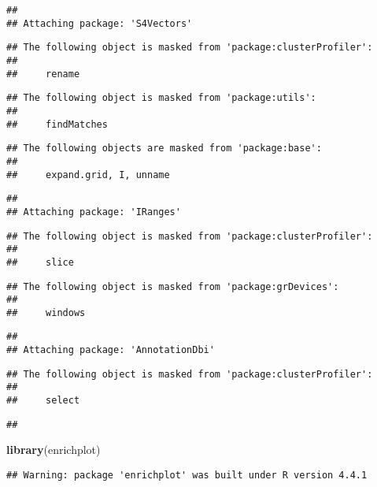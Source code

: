 \documentclass[
]{article}
\newenvironment{Shaded}{\begin{snugshade}}{\end{snugshade}}
\newcommand{\FunctionTok}[1]{\textcolor[rgb]{0.13,0.29,0.53}{\textbf{#1}}}
\newcommand{\NormalTok}[1]{#1}
\begin{document}
\begin{verbatim}
## 
## Attaching package: 'S4Vectors'
\end{verbatim}

\begin{verbatim}
## The following object is masked from 'package:clusterProfiler':
## 
##     rename
\end{verbatim}

\begin{verbatim}
## The following object is masked from 'package:utils':
## 
##     findMatches
\end{verbatim}

\begin{verbatim}
## The following objects are masked from 'package:base':
## 
##     expand.grid, I, unname
\end{verbatim}

\begin{verbatim}
## 
## Attaching package: 'IRanges'
\end{verbatim}

\begin{verbatim}
## The following object is masked from 'package:clusterProfiler':
## 
##     slice
\end{verbatim}

\begin{verbatim}
## The following object is masked from 'package:grDevices':
## 
##     windows
\end{verbatim}

\begin{verbatim}
## 
## Attaching package: 'AnnotationDbi'
\end{verbatim}

\begin{verbatim}
## The following object is masked from 'package:clusterProfiler':
## 
##     select
\end{verbatim}

\begin{verbatim}
## 
\end{verbatim}

\begin{Shaded}
\begin{Highlighting}[]
\FunctionTok{library}\NormalTok{(enrichplot)}
\end{Highlighting}
\end{Shaded}

\begin{verbatim}
## Warning: package 'enrichplot' was built under R version 4.4.1
\end{verbatim}
\end{document}
